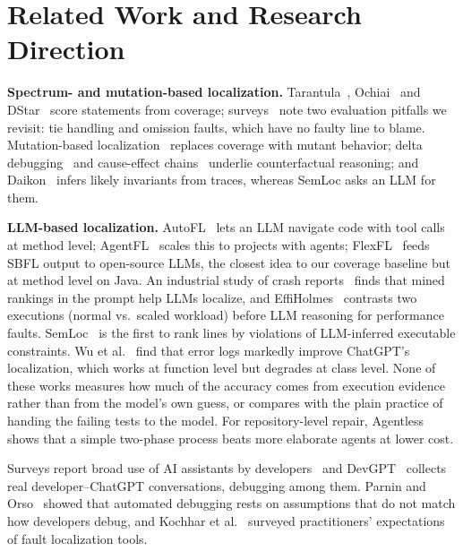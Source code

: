 \section{Related Work and Research Direction}
\label{sec:related}

\textbf{Spectrum- and mutation-based localization.} Tarantula~\cite{jones2002}, Ochiai~\cite{abreu2009} and
DStar~\cite{wong2014dstar} score statements from coverage; surveys~\cite{wong2016survey,desouza2016} note two evaluation
pitfalls we revisit: tie handling and omission faults, which have no faulty line to blame. Mutation-based
localization~\cite{papadakis2015,moon2014} replaces coverage with mutant behavior; delta
debugging~\cite{zeller2002tse} and cause-effect chains~\cite{zeller2002chains} underlie counterfactual reasoning; and
Daikon~\cite{ernst2007daikon} infers likely invariants from traces, whereas SemLoc asks an LLM for them.

\textbf{LLM-based localization.} AutoFL~\cite{kang2024autofl} lets an LLM navigate code with tool calls at method level;
AgentFL~\cite{qin2025agentfl} scales this to projects with agents; FlexFL~\cite{xu2025flexfl} feeds SBFL output to
open-source LLMs, the closest idea to our coverage baseline but at method level on Java. An industrial study of crash
reports~\cite{medeiros2026crash} finds that mined rankings in the prompt help LLMs localize, and EffiHolmes~\cite{yang2026effiholmes}
contrasts two executions (normal vs.\ scaled workload) before LLM reasoning for performance faults. SemLoc~\cite{yang2026semloc}
is the first to rank lines by violations of LLM-inferred executable constraints. Wu et al.~\cite{wu2023llmfl} find that
error logs markedly improve ChatGPT's localization, which works at function level but degrades at class level. None of
these works measures how much of the accuracy comes from execution evidence rather than from the model's own guess, or
compares with the plain practice of handing the failing tests to the model. For repository-level repair,
Agentless~\cite{xia2024agentless} shows that a simple two-phase process beats more elaborate agents at lower cost.

Surveys report broad use of AI assistants by developers~\cite{stackoverflow2025,jetbrains2025} and
DevGPT~\cite{xiao2024devgpt} collects real developer--ChatGPT conversations, debugging among them. Parnin and
Orso~\cite{parnin2011} showed that automated debugging rests on assumptions that do not match how developers debug, and
Kochhar et al.~\cite{kochhar2016} surveyed practitioners' expectations of fault localization tools.

